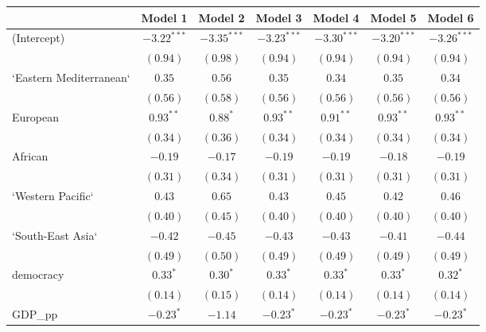 
\begin{table}[!h]
\begin{center}
\begin{tabular}{l c c c c c c }
\toprule
 & Model 1 & Model 2 & Model 3 & Model 4 & Model 5 & Model 6 \\
\midrule
(Intercept)             & $-3.22^{***}$ & $-3.35^{***}$ & $-3.23^{***}$ & $-3.30^{***}$ & $-3.20^{***}$ & $-3.26^{***}$ \\
                        & $(0.94)$      & $(0.98)$      & $(0.94)$      & $(0.94)$      & $(0.94)$      & $(0.94)$      \\
`Eastern Mediterranean` & $0.35$        & $0.56$        & $0.35$        & $0.34$        & $0.35$        & $0.34$        \\
                        & $(0.56)$      & $(0.58)$      & $(0.56)$      & $(0.56)$      & $(0.56)$      & $(0.56)$      \\
European                & $0.93^{**}$   & $0.88^{*}$    & $0.93^{**}$   & $0.91^{**}$   & $0.93^{**}$   & $0.93^{**}$   \\
                        & $(0.34)$      & $(0.36)$      & $(0.34)$      & $(0.34)$      & $(0.34)$      & $(0.34)$      \\
African                 & $-0.19$       & $-0.17$       & $-0.19$       & $-0.19$       & $-0.18$       & $-0.19$       \\
                        & $(0.31)$      & $(0.34)$      & $(0.31)$      & $(0.31)$      & $(0.31)$      & $(0.31)$      \\
`Western Pacific`       & $0.43$        & $0.65$        & $0.43$        & $0.45$        & $0.42$        & $0.46$        \\
                        & $(0.40)$      & $(0.45)$      & $(0.40)$      & $(0.40)$      & $(0.40)$      & $(0.40)$      \\
`South-East Asia`       & $-0.42$       & $-0.45$       & $-0.43$       & $-0.43$       & $-0.41$       & $-0.44$       \\
                        & $(0.49)$      & $(0.50)$      & $(0.49)$      & $(0.49)$      & $(0.49)$      & $(0.49)$      \\
democracy               & $0.33^{*}$    & $0.30^{*}$    & $0.33^{*}$    & $0.33^{*}$    & $0.33^{*}$    & $0.32^{*}$    \\
                        & $(0.14)$      & $(0.15)$      & $(0.14)$      & $(0.14)$      & $(0.14)$      & $(0.14)$      \\
GDP\_pp                 & $-0.23^{*}$   & $-1.14$       & $-0.23^{*}$   & $-0.23^{*}$   & $-0.23^{*}$   & $-0.23^{*}$   \\

\end{tabular}
\end{center}
\end{table}
